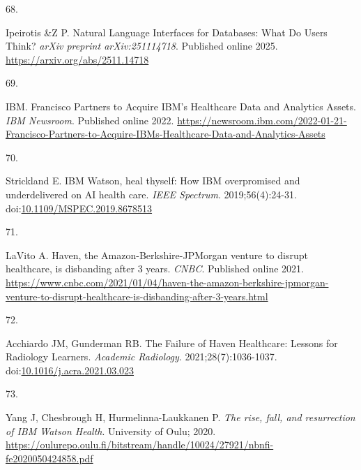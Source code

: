 \documentclass[
  american,
  11pt,
  letterpaper,
  oneside  ,captions=tableheading
]{scrartcl}
\newlength{\cslhangindent}
\newlength{\csllabelwidth}
\newenvironment{CSLReferences}[2] %
 {\begin{list}{}{%
  \setlength{\itemindent}{0pt}
  \setlength{\leftmargin}{0pt}
  \setlength{\parsep}{0pt}
  \ifodd #1
   \setlength{\leftmargin}{\cslhangindent}
   \setlength{\itemindent}{-1\cslhangindent}
  \fi
  \setlength{\itemsep}{#2\baselineskip}}}
 {\end{list}}
\newcommand{\CSLLeftMargin}[1]{\parbox[t]{\csllabelwidth}{\strut#1\strut}}
\newcommand{\CSLRightInline}[1]{\parbox[t]{\linewidth - \csllabelwidth}{\strut#1\strut}}
\begin{document}
\begin{CSLReferences}{0}{1}
\CSLLeftMargin{68. }%
\CSLRightInline{Ipeirotis \&Z P. {Natural Language Interfaces for
Databases: What Do Users Think?} \emph{arXiv preprint arXiv:251114718}.
Published online 2025. \url{https://arxiv.org/abs/2511.14718}}

\CSLLeftMargin{69. }%
\CSLRightInline{IBM. {Francisco Partners to Acquire IBM's Healthcare
Data and Analytics Assets}. \emph{{IBM} Newsroom}. Published online
2022.
\url{https://newsroom.ibm.com/2022-01-21-Francisco-Partners-to-Acquire-IBMs-Healthcare-Data-and-Analytics-Assets}}

\CSLLeftMargin{70. }%
\CSLRightInline{Strickland E. {IBM Watson, heal thyself: How IBM
overpromised and underdelivered on AI health care}. \emph{IEEE
Spectrum}. 2019;56(4):24-31.
doi:\href{https://doi.org/10.1109/MSPEC.2019.8678513}{10.1109/MSPEC.2019.8678513}}

\CSLLeftMargin{71. }%
\CSLRightInline{LaVito A. {Haven, the Amazon-Berkshire-JPMorgan venture
to disrupt healthcare, is disbanding after 3 years}. \emph{{CNBC}}.
Published online 2021.
\url{https://www.cnbc.com/2021/01/04/haven-the-amazon-berkshire-jpmorgan-venture-to-disrupt-healthcare-is-disbanding-after-3-years.html}}

\CSLLeftMargin{72. }%
\CSLRightInline{Acchiardo JM, Gunderman RB. {The Failure of Haven
Healthcare: Lessons for Radiology Learners}. \emph{Academic Radiology}.
2021;28(7):1036-1037.
doi:\href{https://doi.org/10.1016/j.acra.2021.03.023}{10.1016/j.acra.2021.03.023}}

\CSLLeftMargin{73. }%
\CSLRightInline{Yang J, Chesbrough H, Hurmelinna-Laukkanen P. \emph{{The
rise, fall, and resurrection of IBM Watson Health}}. University of Oulu;
2020.
\url{https://oulurepo.oulu.fi/bitstream/handle/10024/27921/nbnfi-fe2020050424858.pdf}}

\end{CSLReferences}
\end{document}
